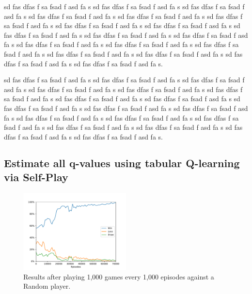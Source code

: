 \documentclass{article}
\newcommand{\GithubURL}[1]{[\href{https://github.com/davidrobles/mlnd-capstone-code/blob/master/#1}{source}]}
\begin{document}
sd fas dfas f sa fsad f asd fa s sd fas dfas f sa fsad f asd fa s sd fas dfas f sa fsad f asd fa s
sd fas dfas f sa fsad f asd fa s sd fas dfas f sa fsad f asd fa s sd fas dfas f sa fsad f asd fa s
sd fas dfas f sa fsad f asd fa s sd fas dfas f sa fsad f asd fa s sd fas dfas f sa fsad f asd fa s
sd fas dfas f sa fsad f asd fa s sd fas dfas f sa fsad f asd fa s sd fas dfas f sa fsad f asd fa s
sd fas dfas f sa fsad f asd fa s sd fas dfas f sa fsad f asd fa s sd fas dfas f sa fsad f asd fa s
sd fas dfas f sa fsad f asd fa s sd fas dfas f sa fsad f asd fa s sd fas dfas f sa fsad f asd fa s.

sd fas dfas f sa fsad f asd fa s sd fas dfas f sa fsad f asd fa s sd fas dfas f sa fsad f asd fa s
sd fas dfas f sa fsad f asd fa s sd fas dfas f sa fsad f asd fa s sd fas dfas f sa fsad f asd fa s
sd fas dfas f sa fsad f asd fa s sd fas dfas f sa fsad f asd fa s sd fas dfas f sa fsad f asd fa s
sd fas dfas f sa fsad f asd fa s sd fas dfas f sa fsad f asd fa s sd fas dfas f sa fsad f asd fa s
sd fas dfas f sa fsad f asd fa s sd fas dfas f sa fsad f asd fa s sd fas dfas f sa fsad f asd fa s
sd fas dfas f sa fsad f asd fa s sd fas dfas f sa fsad f asd fa s sd fas dfas f sa fsad f asd fa s.

\subsection{Estimate all q-values using tabular Q-learning via Self-Play}


\begin{figure}[!h]
    \centering
    \includegraphics[width=0.50\textwidth]{figures/tic_ql_tab_full_selfplay_wld_plot.pdf}
    \caption{Results after playing 1,000 games every 1,000 episodes against a Random player.}
    \label{fig:tic-ql-tab-full-selfplay-wld-plot}
\end{figure}
\end{document}
